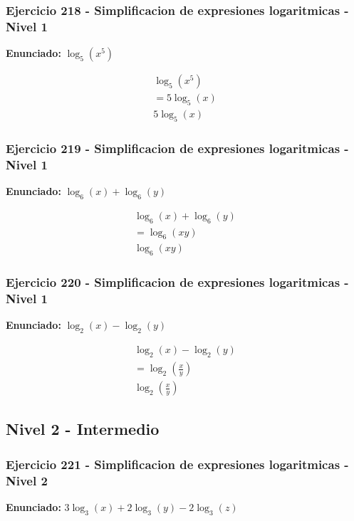 \documentclass[12pt,a4paper]{article}
\begin{document}
\subsubsection*{Ejercicio 218 - Simplificacion de expresiones logaritmicas - Nivel 1}
\textbf{Enunciado:} \(\log_{5}\left(x^{5}\right)\)

\[
\begin{aligned}
\log_{5}\left(x^{5}\right)\\
=5\log_{5}\left(x\right)\\
\boxed{5\log_{5}\left(x\right)}
\end{aligned}
\]


\subsubsection*{Ejercicio 219 - Simplificacion de expresiones logaritmicas - Nivel 1}
\textbf{Enunciado:} \(\log_{6}\left(x\right)+\log_{6}\left(y\right)\)

\[
\begin{aligned}
\log_{6}\left(x\right)+\log_{6}\left(y\right)\\
=\log_{6}\left(xy\right)\\
\boxed{\log_{6}\left(xy\right)}
\end{aligned}
\]


\subsubsection*{Ejercicio 220 - Simplificacion de expresiones logaritmicas - Nivel 1}
\textbf{Enunciado:} \(\log_{2}\left(x\right)-\log_{2}\left(y\right)\)

\[
\begin{aligned}
\log_{2}\left(x\right)-\log_{2}\left(y\right)\\
=\log_{2}\left(\frac{x}{y}\right)\\
\boxed{\log_{2}\left(\frac{x}{y}\right)}
\end{aligned}
\]


\newpage

\subsection*{Nivel 2 - Intermedio}

\subsubsection*{Ejercicio 221 - Simplificacion de expresiones logaritmicas - Nivel 2}
\textbf{Enunciado:} \(3\log_{3}\left(x\right)+2\log_{3}\left(y\right)-2\log_{3}\left(z\right)\)
\end{document}
